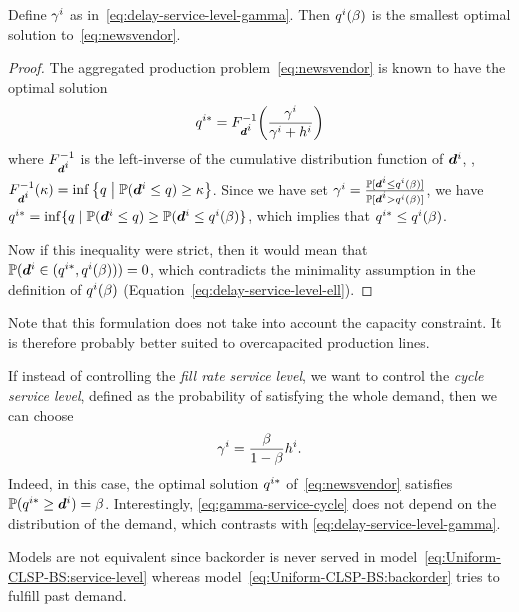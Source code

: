 \begin{prop}\label{prop:vendor}
Define $\gamma^i$ as in~\eqref{eq:delay-service-level-gamma}.
Then $q^i(\beta)$ is the smallest optimal solution to~\eqref{eq:newsvendor}.
\end{prop}


\begin{proof}
The aggregated production problem~\eqref{eq:newsvendor} is known to have the optimal solution
$$\quantity^{i*} = F_{\va d^i}^{-1}\bracket{\frac{\backorder^i}{\backorder^i+h^i}}$$ where $F_{\va d^i}^{-1}$ is the left-inverse of the cumulative distribution function of $\va d^i$,
\ie, $F_{\va d^i}^{-1}(\kappa) = \inf\crbracket{ \quantity\; \big| \; \PP(\va d^i \leq \quantity) \geq \kappa}$.
Since we have set $\backorder^i=\frac{\PP[\va d^i\leq \quantity^i(\servicelvl)]}{\PP[\va d^i>\quantity^i(\servicelvl)]}$,
we have $\quantity^{i*}=\inf\{\quantity \; | \; \PP(\va d^i \leq \quantity) \geq \PP(\va d^i \leq \quantity^i(\beta) \}$, which implies that $q^{i*}\leq q^i(\beta)$.


Now if this inequality were strict, then it would mean that $\PP(\va\demand^i\in(\quantity^{i*},\quantity^i(\beta)))=0$, which contradicts the minimality assumption in the definition of $q^i(\beta)$ (Equation~\eqref{eq:delay-service-level-ell}).
\end{proof}


Note that this formulation does not take into account the capacity constraint.
It is therefore probably better suited to overcapacited production lines.


\begin{rmq}
If instead of controlling the {\em fill rate service level}, we want to control the {\em cycle service level}, defined as the probability of satisfying the whole demand, then we can choose
\begin{equation}
\label{eq:gamma-service-cycle}
\gamma^i = \frac{\beta}{1-\beta} h^i.
\end{equation}
Indeed, in this case, the optimal solution $q^{i*}$ of~\eqref{eq:newsvendor} satisfies $\PP(\quantity^{i*} \geq \va d^i) = \servicelvl$.
Interestingly, \cref{eq:gamma-service-cycle} does not depend on the distribution of the demand, which contrasts with \cref{eq:delay-service-level-gamma}.
\end{rmq}


\begin{rmq}
Models are not equivalent since backorder is never served in model~\eqref{eq:Uniform-CLSP-BS:service-level} whereas model~\eqref{eq:Uniform-CLSP-BS:backorder} tries to fulfill past demand.
\end{rmq}


